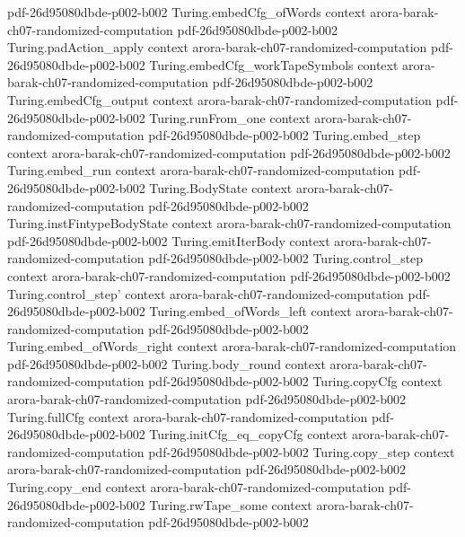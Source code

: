 \begin{theorem}
  {pdf-26d95080dbde-p002-b002}
\proofstep
  {Turing.embedCfg_ofWords}
  {context}
  {arora-barak-ch07-randomized-computation}
  {pdf-26d95080dbde-p002-b002}
\proofstep
  {Turing.padAction_apply}
  {context}
  {arora-barak-ch07-randomized-computation}
  {pdf-26d95080dbde-p002-b002}
\proofstep
  {Turing.embedCfg_workTapeSymbols}
  {context}
  {arora-barak-ch07-randomized-computation}
  {pdf-26d95080dbde-p002-b002}
\proofstep
  {Turing.embedCfg_output}
  {context}
  {arora-barak-ch07-randomized-computation}
  {pdf-26d95080dbde-p002-b002}
\proofstep
  {Turing.runFrom_one}
  {context}
  {arora-barak-ch07-randomized-computation}
  {pdf-26d95080dbde-p002-b002}
\proofstep
  {Turing.embed_step}
  {context}
  {arora-barak-ch07-randomized-computation}
  {pdf-26d95080dbde-p002-b002}
\proofstep
  {Turing.embed_run}
  {context}
  {arora-barak-ch07-randomized-computation}
  {pdf-26d95080dbde-p002-b002}
\proofstep
  {Turing.BodyState}
  {context}
  {arora-barak-ch07-randomized-computation}
  {pdf-26d95080dbde-p002-b002}
\proofstep
  {Turing.instFintypeBodyState}
  {context}
  {arora-barak-ch07-randomized-computation}
  {pdf-26d95080dbde-p002-b002}
\proofstep
  {Turing.emitIterBody}
  {context}
  {arora-barak-ch07-randomized-computation}
  {pdf-26d95080dbde-p002-b002}
\proofstep
  {Turing.control_step}
  {context}
  {arora-barak-ch07-randomized-computation}
  {pdf-26d95080dbde-p002-b002}
\proofstep
  {Turing.control_step'}
  {context}
  {arora-barak-ch07-randomized-computation}
  {pdf-26d95080dbde-p002-b002}
\proofstep
  {Turing.embed_ofWords_left}
  {context}
  {arora-barak-ch07-randomized-computation}
  {pdf-26d95080dbde-p002-b002}
\proofstep
  {Turing.embed_ofWords_right}
  {context}
  {arora-barak-ch07-randomized-computation}
  {pdf-26d95080dbde-p002-b002}
\proofstep
  {Turing.body_round}
  {context}
  {arora-barak-ch07-randomized-computation}
  {pdf-26d95080dbde-p002-b002}
\proofstep
  {Turing.copyCfg}
  {context}
  {arora-barak-ch07-randomized-computation}
  {pdf-26d95080dbde-p002-b002}
\proofstep
  {Turing.fullCfg}
  {context}
  {arora-barak-ch07-randomized-computation}
  {pdf-26d95080dbde-p002-b002}
\proofstep
  {Turing.initCfg_eq_copyCfg}
  {context}
  {arora-barak-ch07-randomized-computation}
  {pdf-26d95080dbde-p002-b002}
\proofstep
  {Turing.copy_step}
  {context}
  {arora-barak-ch07-randomized-computation}
  {pdf-26d95080dbde-p002-b002}
\proofstep
  {Turing.copy_end}
  {context}
  {arora-barak-ch07-randomized-computation}
  {pdf-26d95080dbde-p002-b002}
\proofstep
  {Turing.rwTape_some}
  {context}
  {arora-barak-ch07-randomized-computation}
  {pdf-26d95080dbde-p002-b002}

\end{theorem}
